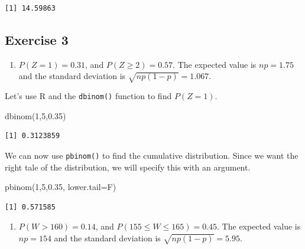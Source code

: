 \documentclass[
  letterpaper,
  DIV=11,
  numbers=noendperiod]{scrreprt}
\newenvironment{Shaded}{\begin{snugshade}}{\end{snugshade}}
\newcommand{\AttributeTok}[1]{\textcolor[rgb]{0.40,0.45,0.13}{#1}}
\newcommand{\DecValTok}[1]{\textcolor[rgb]{0.68,0.00,0.00}{#1}}
\newcommand{\FloatTok}[1]{\textcolor[rgb]{0.68,0.00,0.00}{#1}}
\newcommand{\FunctionTok}[1]{\textcolor[rgb]{0.28,0.35,0.67}{#1}}
\newcommand{\NormalTok}[1]{\textcolor[rgb]{0.00,0.23,0.31}{#1}}
\providecommand{\tightlist}{%
  \setlength{\itemsep}{0pt}\setlength{\parskip}{0pt}}\usepackage{longtable,booktabs,array}
\begin{document}
\begin{verbatim}
[1] 14.59863
\end{verbatim}

\hypertarget{exercise-3-17}{%
\subsection*{Exercise 3}\label{exercise-3-17}}

\begin{blackbox}

\begin{enumerate}
\def\labelenumi{\arabic{enumi}.}
\tightlist
\item
  \(P(Z=1)=0.31\), and \(P(Z \geq 2)=0.57\). The expected value is
  \(np=1.75\) and the standard deviation is \(\sqrt{np(1-p)}=1.067\).
\end{enumerate}

\end{blackbox}

Let's use R and the \texttt{dbinom()} function to find \(P(Z=1)\).

\begin{Shaded}
\begin{Highlighting}[numbers=left,,]
\FunctionTok{dbinom}\NormalTok{(}\DecValTok{1}\NormalTok{,}\DecValTok{5}\NormalTok{,}\FloatTok{0.35}\NormalTok{)}
\end{Highlighting}
\end{Shaded}

\begin{verbatim}
[1] 0.3123859
\end{verbatim}

We can now use \texttt{pbinom()} to find the cumulative distribution.
Since we want the right tale of the distribution, we will specify this
with an argument.

\begin{Shaded}
\begin{Highlighting}[numbers=left,,]
\FunctionTok{pbinom}\NormalTok{(}\DecValTok{1}\NormalTok{,}\DecValTok{5}\NormalTok{,}\FloatTok{0.35}\NormalTok{, }\AttributeTok{lower.tail=}\NormalTok{F)}
\end{Highlighting}
\end{Shaded}

\begin{verbatim}
[1] 0.571585
\end{verbatim}

\begin{blackbox}

\begin{enumerate}
\def\labelenumi{\arabic{enumi}.}
\setcounter{enumi}{1}
\tightlist
\item
  \(P(W>160)=0.14\), and \(P(155 \leq W \leq 165 )=0.45\). The expected
  value is \(np=154\) and the standard deviation is
  \(\sqrt{np(1-p)}=5.95\).
\end{enumerate}

\end{blackbox}
\end{document}

